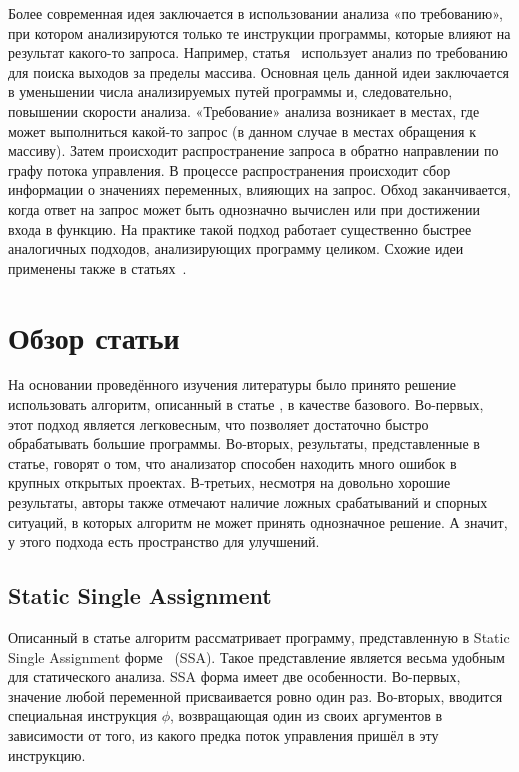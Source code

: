 Более современная идея заключается в использовании анализа «по
требованию», при котором анализируются только те инструкции программы,
которые влияют на результат какого-то запроса. Например,
статья~\cite{le2008marple} использует анализ по требованию для поиска
выходов за пределы массива. Основная цель данной идеи заключается в
уменьшении числа анализируемых путей программы и, следовательно,
повышении скорости анализа. «Требование» анализа возникает в местах,
где может выполниться какой-то запрос (в данном случае в местах
обращения к массиву). Затем происходит распространение запроса в
обратно направлении по графу потока управления. В процессе
распространения происходит сбор информации о значениях переменных,
влияющих на запрос. Обход заканчивается, когда ответ на запрос может
быть однозначно вычислен или при достижении входа в функцию. На
практике такой подход работает существенно быстрее аналогичных
подходов, анализирующих программу целиком. Схожие идеи применены также
в статьях~\cite{ding2012detection, ding2014abor, li2010practical}.

\section{Обзор статьи~\cite{li2010practical}}

На основании проведённого изучения литературы было принято решение
использовать алгоритм, описанный в статье \cite{li2010practical}, в
качестве базового. Во-первых, этот подход является легковесным, что
позволяет достаточно быстро обрабатывать большие программы. Во-вторых,
результаты, представленные в статье, говорят о том, что анализатор
способен находить много ошибок в крупных открытых проектах. В-третьих,
несмотря на довольно хорошие результаты, авторы также отмечают наличие
ложных срабатываний и спорных ситуаций, в которых алгоритм не может
принять однозначное решение. А значит, у этого подхода есть
пространство для улучшений.

\subsection{Static Single Assignment}

Описанный в статье алгоритм рассматривает программу, представленную в
Static Single Assignment форме~\cite{cytron1991efficiently} (SSA). Такое
представление является весьма удобным для статического анализа. SSA
форма имеет две особенности. Во-первых, значение любой переменной
присваивается ровно один раз. Во-вторых, вводится специальная
инструкция $\phi$, возвращающая один из своих аргументов в зависимости
от того, из какого предка поток управления пришёл в эту инструкцию.


